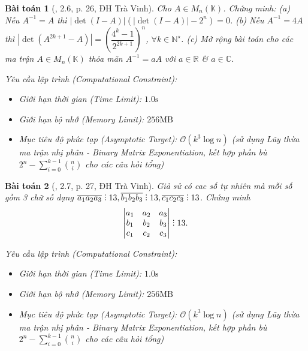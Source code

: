 \documentclass{article}
\DeclareRobustCommand{\divby}{%
	\mathrel{\vbox{\baselineskip.65ex\lineskiplimit0pt\hbox{.}\hbox{.}\hbox{.}}}%
}
\newtheorem{baitoan}{Bài toán}
\begin{document}
\begin{baitoan}[\cite{VMS_VMC2024}, 2.6, p. 26, ĐH Trà Vinh]
	Cho $A\in M_n(\mathbb{K})$. Chứng minh: (a) Nếu $A^{-1} = A$ thì $|\det(I - A)|(|\det(I - A)| - 2^n) = 0$. (b) Nếu $A^{-1} = 4A$ thì $|\det(A^{2k+1} - A)| = \left(\dfrac{4^k - 1}{2^{2k + 1}}\right)^n$, $\forall k\in\mathbb{N}^\star$. (c) Mở rộng bài toán cho các ma trận $A\in M_n(\mathbb{K})$ thỏa mãn $A^{-1} = aA$ với $a\in\mathbb{R}$ \& $a\in\mathbb{C}$.

    \vspace{0.5em}
    \emph{Yêu cầu lập trình (Computational Constraint):}
    \begin{itemize}
        \item Giới hạn thời gian (Time Limit): $1.0\mathrm{s}$
        \item Giới hạn bộ nhớ (Memory Limit): $256\mathrm{MB}$
        \item Mục tiêu độ phức tạp (Asymptotic Target): $\mathcal{O}(k^3 \log n)$ (sử dụng Lũy thừa ma trận nhị phân - Binary Matrix Exponentiation, kết hợp phần bù $2^n - \sum_{i=0}^{k-1} \binom{n}{i}$ cho các câu hỏi tổng)
    \end{itemize}
\end{baitoan}


\begin{baitoan}[\cite{VMS_VMC2024}, 2.7, p. 27, ĐH Trà Vinh]
	Giả sử có cac số tự nhiên mà mỗi số gồm 3 chữ số dạng $\overline{a_1a_2a_3}\divby13,\overline{b_1b_2b_3}\divby13,\overline{c_1c_2c_3}\divby13$. Chứng minh
	\begin{equation*}
		\begin{vmatrix}
			a_1 & a_2 & a_3\\b_1 & b_2 & b_3\\c_1 & c_2 & c_3
		\end{vmatrix}\divby13.
	\end{equation*}

    \vspace{0.5em}
    \emph{Yêu cầu lập trình (Computational Constraint):}
    \begin{itemize}
        \item Giới hạn thời gian (Time Limit): $1.0\mathrm{s}$
        \item Giới hạn bộ nhớ (Memory Limit): $256\mathrm{MB}$
        \item Mục tiêu độ phức tạp (Asymptotic Target): $\mathcal{O}(k^3 \log n)$ (sử dụng Lũy thừa ma trận nhị phân - Binary Matrix Exponentiation, kết hợp phần bù $2^n - \sum_{i=0}^{k-1} \binom{n}{i}$ cho các câu hỏi tổng)
    \end{itemize}
\end{baitoan}
\end{document}
